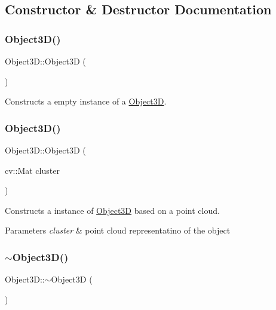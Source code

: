 \subsection{Constructor \& Destructor Documentation}
\hypertarget{class_object3_d_ae3a1b17fb43ab59f5cf7b0ee21b9120b}{}\label{class_object3_d_ae3a1b17fb43ab59f5cf7b0ee21b9120b} 
\subsubsection{\texorpdfstring{Object3\+D()}{Object3D()}\hspace{0.1cm}{\footnotesize\ttfamily [1/2]}}
{\footnotesize\ttfamily Object3\+D\+::\+Object3D (\begin{DoxyParamCaption}{ }\end{DoxyParamCaption})}



Constructs a empty instance of a \hyperlink{class_object3_d}{Object3D}. 

\hypertarget{class_object3_d_a7ed04ee42be0d19ad0a446375fd7ade4}{}\label{class_object3_d_a7ed04ee42be0d19ad0a446375fd7ade4} 
\subsubsection{\texorpdfstring{Object3\+D()}{Object3D()}\hspace{0.1cm}{\footnotesize\ttfamily [2/2]}}
{\footnotesize\ttfamily Object3\+D\+::\+Object3D (\begin{DoxyParamCaption}\item[{cv\+::\+Mat}]{cluster }\end{DoxyParamCaption})}



Constructs a instance of \hyperlink{class_object3_d}{Object3D} based on a point cloud. 


\begin{DoxyParams}{Parameters}
{\em cluster} & point cloud representatino of the object \\
\hline
\end{DoxyParams}
\hypertarget{class_object3_d_a73b016a1aa7eb3be3c49671f3054565d}{}\label{class_object3_d_a73b016a1aa7eb3be3c49671f3054565d} 
\subsubsection{\texorpdfstring{$\sim$\+Object3\+D()}{~Object3D()}}
{\footnotesize\ttfamily Object3\+D\+::$\sim$\+Object3D (\begin{DoxyParamCaption}{ }\end{DoxyParamCaption})}



